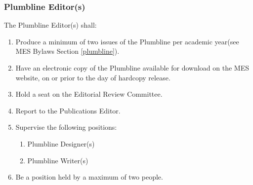 
\subsubsection{Plumbline Editor(s)}
\label{plumbline-editors}
The Plumbline Editor(s) shall:

\begin{enumerate}
 \item
  Produce a minimum of two issues of the Plumbline per academic year(see MES Bylaws Section \ref{plumbline}).
 \item
  Have an electronic copy of the Plumbline available for download on the MES website, on or prior to the day of hardcopy release.
 \item
  Hold a seat on the Editorial Review Committee. 
 \item     
  Report to the Publications Editor.
 \item    
  Supervise the following positions: 
  \begin{enumerate} 
    \item    
     Plumbline Designer(s) 
    \item     
     Plumbline Writer(s)  
  \end{enumerate} 
 \item  
  Be a position held by a maximum of two people.

\end{enumerate}